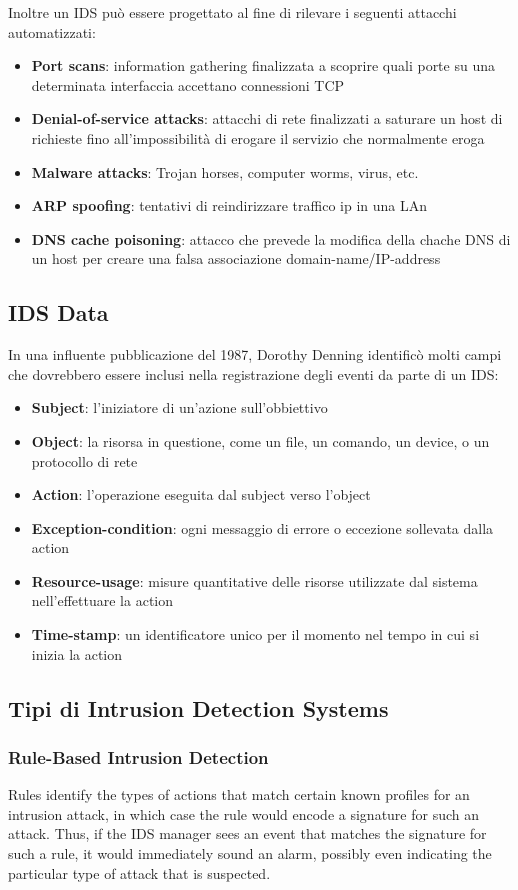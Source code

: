 Inoltre un IDS può essere progettato al fine di rilevare i seguenti attacchi automatizzati:
\begin{itemize}
\item \textbf{Port scans}: information gathering finalizzata a scoprire quali porte su una determinata interfaccia accettano connessioni TCP
\item \textbf{Denial-of-service attacks}: attacchi di rete finalizzati a saturare un host di richieste fino all'impossibilità di erogare il servizio che normalmente eroga
\item \textbf{Malware attacks}: Trojan horses, computer worms, virus, etc.
\item \textbf{ARP spoofing}: tentativi di reindirizzare traffico ip in una LAn
\item \textbf{DNS cache poisoning}: attacco che prevede la modifica della chache DNS di un host per creare una falsa associazione domain-name/IP-address 
\end{itemize}

\subsection{IDS Data} 
In una influente pubblicazione del 1987, Dorothy Denning identificò molti campi che dovrebbero essere inclusi nella registrazione degli eventi da parte di un IDS:
\begin{itemize}
\item \textbf{Subject}: l'iniziatore di un'azione sull'obbiettivo
\item \textbf{Object}: la risorsa in questione, come un file, un comando, un device, o un protocollo di rete
\item \textbf{Action}: l'operazione eseguita dal subject verso l'object
\item \textbf{Exception-condition}: ogni messaggio di errore o eccezione sollevata dalla action
\item \textbf{Resource-usage}: misure quantitative delle risorse utilizzate dal sistema nell'effettuare la action
\item \textbf{Time-stamp}: un identificatore unico per il momento nel tempo in cui si inizia la action
\end{itemize}

\subsection{Tipi di Intrusion Detection Systems} 
\subsubsection{Rule-Based Intrusion Detection} 
Rules identify the types of actions that match certain known profiles for an intrusion attack, in which case the rule would encode a signature for such an attack. Thus, if the IDS manager sees an event that matches the signature for such a rule, it would immediately sound an alarm, possibly even indicating the particular type of attack that is suspected.

